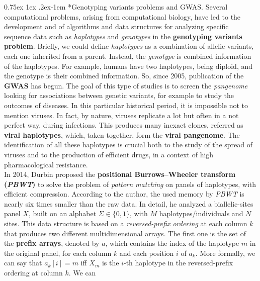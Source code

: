 \documentclass[a4paper,11pt, oneside]{article}
\makeatletter
\renewcommand{\paragraph}{%
  \@startsection{paragraph}{4}%
  {\z@}{0.75ex \@plus 1ex \@minus .2ex}{-1em}%
  {\normalfont\normalsize\bfseries}%
}
\makeatother
\begin{document}
\paragraph*{Genotyping variants problems and GWAS.}
Several computational problems, arising from computational
biology, have led to the development and of algorithms and data
structures for analyzing specific sequence data such as \textit{haplotypes} and
\textit{genotypes} in the \textbf{genotyping variants problem}. Briefly, we
could define \textit{haplotypes} as a combination of allelic variants, each one
inherited from a parent. Instead, the \textit{genotype} is combined information
of the haplotypes. For example, humans have two haplotypes, being diploid, and
the genotype is their combined information. So, since 2005, publication of the
\textbf{GWAS} has begun. The goal of this type of studies is to screen the
\textit{pangenome} looking for associations between genetic variants, for
example to study the outcomes of diseases. In this particular historical
period, it is impossible not to mention viruses. In fact, by nature, viruses
replicate a lot but often in a not perfect way, during infections. This produces
many inexact clones, referred as \textbf{viral haplotypes}, which, taken
together, form the \textbf{viral pangenome}. The identification of all these
haplotypes is crucial both to the study of the spread of viruses and to the
production of efficient drugs, in a context of high pharmacological
resistance.\\
In 2014, Durbin proposed the
\textbf{positional Burrows–Wheeler transform (\textit{PBWT})} to
solve the problem of \textit{pattern matching} on panels of haplotypes,
with efficient compression. According to the author, the used
memory by \textit{PBWT} is nearly six times smaller than the raw data.
In detail, he analyzed a biallelic-sites panel $X$, built on an
alphabet $\Sigma\in\{0,1\}$, with $M$ haplotypes/individuals and $N$ sites. This
data structure is based on a \textit{reversed-prefix ordering} at 
each column $k$ that produces two different multidimensional arrays. The first
one is the set of the \textbf{prefix arrays}, denoted by $a$, which contains the
index of the haplotype $m$ in the original panel, for each column $k$ and
each position $i$ of $a_k$. More formally, we can say that $a_k[i]=m$ iff $X_m$
is the $i$-th haplotype in the reversed-prefix ordering at column $k$. We can
\end{document}
